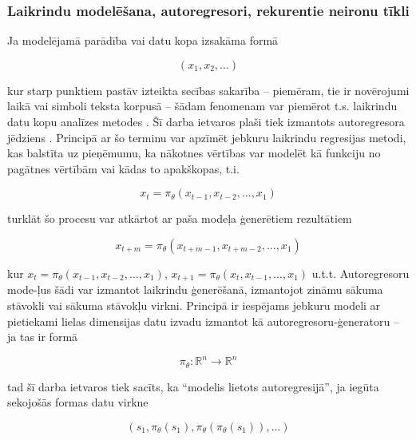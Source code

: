 \documentclass[12pt, a4paper]{article}
\numberwithin{equation}{section} %
\begin{document}
\subsubsection{Laikrindu modelēšana, autoregresori, rekurentie neironu tīkli}

Ja modelējamā parādība vai datu kopa izsakāma formā

\begin{equation} 
    (x_1, x_2, ...)
\end{equation}

kur starp punktiem pastāv izteikta secības sakarība -- piemēram, tie ir novērojumi laikā vai simboli teksta korpusā -- šādam fenomenam var piemērot t.s. laikrindu datu kopu analīzes metodes \cite{time_series}. Šī darba ietvaros plaši tiek izmantots autoregresora jēdziens \cite{autoregressor}. Principā ar šo terminu var apzīmēt jebkuru laikrindu regresijas metodi, kas balstīta uz pieņēmumu, ka nākotnes vērtības var modelēt kā funkciju no pagātnes vērtībām vai kādas to apakškopas, t.i.

\begin{equation} 
    x_t = \pi_{\theta}(x_{t-1}, x_{t-2}, ..., x_1)
\end{equation}

turklāt šo procesu var atkārtot ar paša modeļa ģenerētiem rezultātiem

\begin{equation} 
    x_{t+m} = \pi_{\theta}(x_{t+m-1}, x_{t+m-2}, ..., x_1)
\end{equation}

kur $x_{t} =  \pi_{\theta}(x_{t-1}, x_{t-2}, ..., x_1)$, $x_{t+1} =  \pi_{\theta}(x_{t}, x_{t-1}, ..., x_1)$ u.t.t. Autoregresoru mode-ļus šādi var izmantot laikrindu ģenerēšanā, izmantojot zināmu sākuma stāvokli vai sākuma stāvokļu virkni. Principā ir iespējams jebkuru modeli ar pietiekami lielas dimensijas datu izvadu izmantot kā autoregresoru-ģeneratoru -- ja tas ir formā 

\begin{equation} 
    \pi_{\theta}: \mathbb{R}^n \rightarrow \mathbb{R}^n
\end{equation}

tad šī darba ietvaros tiek sacīts, ka ``modelis lietots autoregresijā'', ja iegūta sekojošās formas datu virkne

\begin{equation} 
    (s_1, \pi_{\theta}(s_1), \pi_{\theta}(\pi_{\theta}(s_1)), ... )
\end{equation}
\end{document}
